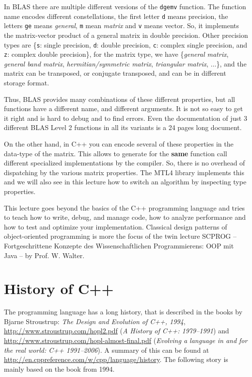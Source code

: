 \begin{rem}
  In BLAS there are multiple different versions of the \texttt{dgemv} function. The function name encodes different constellations, \ie
  the first letter \texttt{d} means  precision, the letters \texttt{ge} means \emph{general}, \texttt{m} mean \emph{matrix}
  and \texttt{v} means vector. So, it implements the matrix-vector product of a general matrix in double precision. Other precision
  types are \{\texttt{s}: single precision, \texttt{d}: double precision, \texttt{c}: complex single precision, and \texttt{z}: complex
  double precision\}, for the matrix type, we have \{\emph{general matrix}, \emph{general band matrix}, \emph{hermitian/symmetric matrix},
  \emph{triangular matrix}, $\ldots$\}, and the matrix can be transposed, or conjugate transposed, and can be in different storage format.

  Thus, BLAS provides many combinations of these different properties, but all functions have a different name, and different arguments. It
  is not so easy to get it right and is hard to debug and to find errors. Even the documentation of just 3 different BLAS Level 2 functions
  in all its variants is a 24 pages long document.

  On the other hand, in C++ you can encode several of these properties in the data-type of the matrix. This allows to generate for the \textbf{same}
  function call different specialized implementations by the compiler. So, there is no overhead of dispatching by the various matrix properties.
  The MTL4 library implements this and we will also see in this lecture how to switch an algorithm by inspecting type properties.
\end{rem}

This lecture goes beyond the basics of the C++ programming language and tries to teach how to write, debug, and manage code, how to analyze
performance and how to test and optimize your implementation. Classical design patterns of object-oriented programming is more the focus of
the twin lecture SCPROG -- Fortgeschrittene Konzepte des Wissenschaftlichen Programmierens: OOP mit Java -- by Prof. W. Walter.


\section{History of C++}
The programming language has a long history, that is described in the books by Bjarne Stroustrup: \emph{The Design and Evolution of C++, 1994},
\url{http://www.stroustrup.com/hopl2.pdf} (\emph{A History of C++: 1979--1991}) and \url{http://www.stroustrup.com/hopl-almost-final.pdf}
(\emph{Evolving a language in and for the real world: C++ 1991--2006}). A summary of this can be found at
\url{http://en.cppreference.com/w/cpp/language/history}. The following story is mainly based on the book from 1994.

